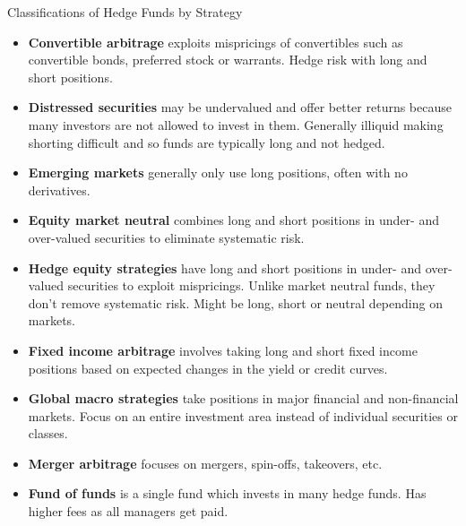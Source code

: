\documentclass[../custom]{flashcards}
\begin{document}
\begin{flashcard}{Classifications of Hedge Funds by Strategy}
    \begin{itemize}[itemsep=.5\itemsep]
        \item \textbf{Convertible arbitrage} exploits mispricings of convertibles such as convertible bonds, preferred stock or warrants. Hedge risk with long and short positions.
        \item \textbf{Distressed securities} may be undervalued and offer better returns because many investors are not allowed to invest in them. Generally illiquid making shorting difficult and so funds are typically long and not hedged.
        \item \textbf{Emerging markets} generally only use long positions, often with no derivatives.
        \item \textbf{Equity market neutral} combines long and short positions in under- and over-valued securities to eliminate systematic risk.
        \item \textbf{Hedge equity strategies} have long and short positions in under- and over-valued securities to exploit mispricings. Unlike market neutral funds, they don't remove systematic risk. Might be long, short or neutral depending on markets.
        \item \textbf{Fixed income arbitrage} involves taking long and short fixed income positions based on expected changes in the yield or credit curves.
        \item \textbf{Global macro strategies} take positions in major financial and non-financial markets. Focus on an entire investment area instead of individual securities or classes.
        \item \textbf{Merger arbitrage} focuses on mergers, spin-offs, takeovers, etc.
        \item \textbf{Fund of funds} is a single fund which invests in many hedge funds. Has higher fees as all managers get paid.
    \end{itemize}
\end{flashcard}
\end{document}
